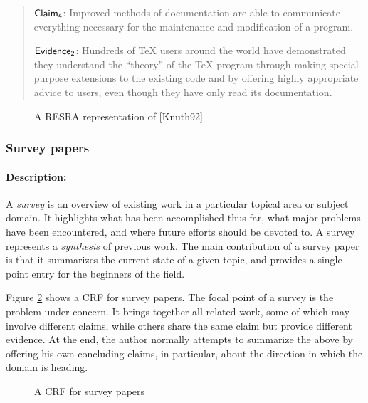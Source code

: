 \begin{itemize}
{\begin{quotation}
  \noindent\( {\sf Claim_{4}} \): Improved methods of documentation are able to
  communicate everything necessary for the maintenance and modification of
  a program.
  
  \noindent\( {\sf Evidence_{2}} \): Hundreds of \TeX\/ users around the
  world have demonstrated they understand the ``theory'' of the \TeX\/
  program through making special-purpose extensions to the existing code
  and by offering highly appropriate advice to users, even though they
  have only read its documentation.
\end{quotation}
\normalsize

\begin{figure}[htb]
  \caption{A RESRA representation of [Knuth92]}
  \label{fig:knuth}
\end{figure}


\subsubsection{Survey papers}

\paragraph{Description:}

A {\it survey\/} is an overview of existing work in a particular topical
area or subject domain. It highlights what has been accomplished thus far,
what major problems have been encountered, and where future efforts should
be devoted to. A survey represents a {\it synthesis\/} of previous work.
The main contribution of a survey paper is that it summarizes the current
state of a given topic, and provides a single-point entry for the
beginners of the field.

Figure \ref{fig:survey-crf} shows a CRF for survey papers. The focal
point of a survey is the problem under concern. It brings together all
related work, some of which may involve different claims, while others
share the same claim but provide different evidence. At the end, the author
normally attempts to summarize the above by offering his own concluding
claims, in particular, about the direction in which the domain is heading.

\begin{figure}[htb]
  \caption{A CRF for survey papers}
  \label{fig:survey-crf}
\end{figure}


}
\end{itemize}
